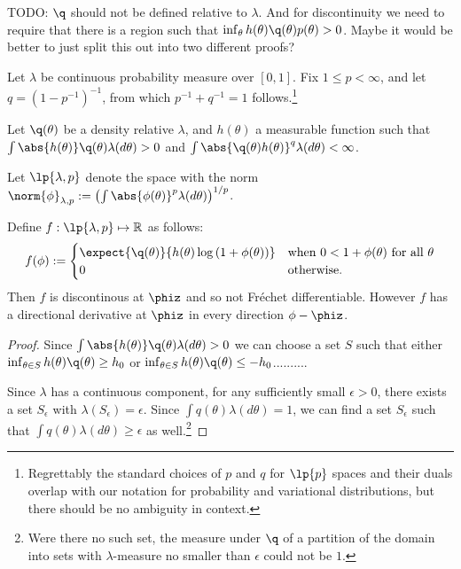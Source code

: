 \begin{lem}

TODO: $\q$ should not be defined relative to $\lambda$.  And for
discontinuity we need
to require that there is a region such that
$\inf_\theta h(\theta) \q(\theta) p(\theta) > 0$.  Maybe it would be
better to just split this out into two different proofs?

Let $\lambda$ be continuous probability measure over $[0,1]$. Fix $1 \le p <
\infty$, and let $q = (1 - p^{-1})^{-1}$, from which $p^{-1} + q^{-1}=1$
follows.\footnote{Regrettably the standard choices of $p$ and $q$ for $\lp{p}$
spaces and their duals overlap with our notation for probability and variational
distributions, but there should be no ambiguity in context.}

Let $\q(\theta)$ be a density relative $\lambda$, and $h(\theta)$ a measurable
function such that $\int \abs{h(\theta)} \q(\theta) \lambda(d\theta) > 0$ and
$\int \abs{ \q(\theta) h(\theta)}^q \lambda(d\theta) < \infty$.

Let $\lp{\lambda,p}$ denote the space with the norm
$\norm{\phi}_{\lambda,p} := \left(\int \abs{\phi(\theta)}^p \lambda(d\theta)
\right)^{1/p}$.

Define $f: \lp{\lambda, p} \mapsto \mathbb{R}$ as follows:
%
\begin{align*}
%
f(\phi) :=
\begin{cases}
    \expect{\q(\theta)}{h(\theta) \log \left(1 + \phi(\theta)\right)} &
    \textrm{when }0 < 1 + \phi(\theta)\textrm{ for all }\theta \\
    0 & \textrm{otherwise}.
%
\end{cases}
%
\end{align*}
%
Then $f$ is discontinous at $\phiz$ and so not Fr{\'e}chet differentiable.
However $f$ has a directional derivative at $\phiz$ in every direction $\phi -
\phiz$.

\begin{proof}
%
Since $\int \abs{h(\theta)} \q(\theta) \lambda(d\theta) > 0$ we can choose a set
$S$ such that either $\inf_{\theta \in S} h(\theta) \q(\theta) \ge h_0$ or
$\inf_{\theta \in S} h(\theta) \q(\theta) \le -h_0$..........

Since $\lambda$ has a continuous component, for any sufficiently small $\epsilon >
0$, there exists a set $S_\epsilon$ with $\lambda(S_\epsilon) = \epsilon$. Since
$\int q(\theta) \lambda(d\theta) = 1$, we can find a set $S_\epsilon$ such that
$\int q(\theta) \lambda(d\theta) \ge \epsilon$ as well.\footnote{Were there no
such set, the measure under $\q$ of a partition of the domain into sets with
$\lambda$-measure no smaller than $\epsilon$ could not be $1$.}


\end{proof}
\end{lem}
